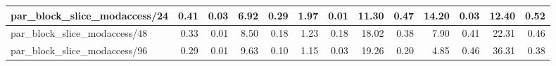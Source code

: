 \begin{tabular}{|lllllllllllll|}
\multicolumn{1}{|l|}{par\_block\_slice\_modaccess/24}  & \multicolumn{1}{r|}{0.41} & \multicolumn{1}{r|}{0.03} & \multicolumn{1}{r|}{6.92} & \multicolumn{1}{r|}{0.29}  & \multicolumn{1}{r|}{1.97} & \multicolumn{1}{r|}{0.01} & \multicolumn{1}{r|}{11.30} & \multicolumn{1}{r|}{0.47}  & \multicolumn{1}{r|}{14.20} & \multicolumn{1}{r|}{0.03} & \multicolumn{1}{r|}{12.40} & \multicolumn{1}{r|}{0.52}  \\ \hline
\multicolumn{1}{|l|}{par\_block\_slice\_modaccess/48}  & \multicolumn{1}{r|}{0.33} & \multicolumn{1}{r|}{0.01} & \multicolumn{1}{r|}{8.50} & \multicolumn{1}{r|}{0.18}  & \multicolumn{1}{r|}{1.23} & \multicolumn{1}{r|}{0.18} & \multicolumn{1}{r|}{18.02} & \multicolumn{1}{r|}{0.38}  & \multicolumn{1}{r|}{7.90} & \multicolumn{1}{r|}{0.41} & \multicolumn{1}{r|}{22.31} & \multicolumn{1}{r|}{0.46}  \\ \hline
\multicolumn{1}{|l|}{par\_block\_slice\_modaccess/96}  & \multicolumn{1}{r|}{0.29} & \multicolumn{1}{r|}{0.01} & \multicolumn{1}{r|}{9.63} & \multicolumn{1}{r|}{0.10}  & \multicolumn{1}{r|}{1.15} & \multicolumn{1}{r|}{0.03} & \multicolumn{1}{r|}{19.26} & \multicolumn{1}{r|}{0.20}  & \multicolumn{1}{r|}{4.85} & \multicolumn{1}{r|}{0.46} & \multicolumn{1}{r|}{36.31} & \multicolumn{1}{r|}{0.38}  \\ \hline
\end{tabular}
